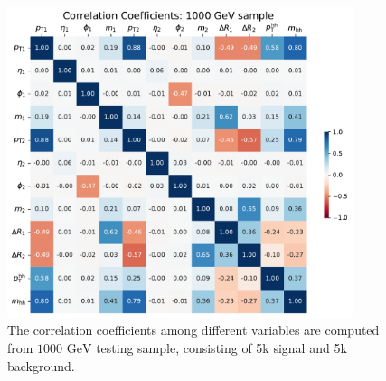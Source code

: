 \documentclass[12pt]{article}
\begin{document}
        \begin{figure}[htpb]
            \centering
            \includegraphics[width=0.9\textwidth]{correlation_coefficients-1000GeV.pdf}
            \caption{The correlation coefficients among different variables are computed from $\text{1000 GeV}$ testing sample, consisting of 5k signal and 5k background.}
            \label{fig:correlation_coefficient_1000GeV}
        \end{figure}
\end{document}
